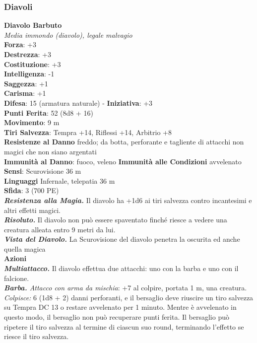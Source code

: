 \begin{multicols}{2}
\subsubsection{Diavoli}

\medskip\textbf{Diavolo Barbuto}\\
\emph{Media immondo (diavolo), legale malvagio}\\
\textbf{Forza}: +3\\
\textbf{Destrezza}: +3\\
\textbf{Costituzione}: +3\\
\textbf{Intelligenza}: -1\\
\textbf{Saggezza}: +1\\
\textbf{Carisma}: +1\\
\textbf{Difesa}: 15 (armatura naturale) - \textbf{Iniziativa}: +3\\
\textbf{Punti Ferita}: 52 (8d8 + 16)\\
\textbf{Movimento}: 9 m\\
\textbf{Tiri Salvezza}: Tempra +14, Riflessi +14, Arbitrio +8\\
\textbf{Resistenze al Danno} freddo; da botta, perforante e tagliente di attacchi non magici che non siano argentati\\
\textbf{Immunità al Danno}: fuoco, veleno \textbf{Immunità alle Condizioni} avvelenato\\
\textbf{Sensi}: Scurovisione 36 m\\
\textbf{Linguaggi} Infernale, telepatia 36 m \\
\textbf{Sfida}: 3 (700 PE)\smallskip\\
\emph{\textbf{Resistenza alla Magia.}} Il diavolo ha +1d6 ai tiri salvezza contro incantesimi e altri effetti magici.\\
\emph{\textbf{Risoluto.}} Il diavolo non può essere spaventato finché riesce a vedere una creatura alleata entro 9 metri da lui.\\
\emph{\textbf{Vista del Diavolo.}} La Scurovisione del diavolo penetra la oscurita ed anche quella magica\\
\smallskip\textbf{Azioni}\\
\emph{\textbf{Multiattacco.}} Il diavolo effettua due attacchi: uno con la barba e uno con il falcione.\\
\emph{\textbf{Barba.} Attacco con arma da mischia}: +7 al colpire, portata 1 m, una creatura.\\
\emph{Colpisce:} 6 (1d8 + 2) danni perforanti, e il bersaglio deve riuscire un tiro salvezza su Tempra DC  13 o restare avvelenato per 1 minuto. Mentre è avvelenato in questo modo, il bersaglio non può recuperare punti ferita. Il bersaglio può ripetere il tiro salvezza al termine di ciascun suo round, terminando l'effetto se riesce il tiro salvezza.\\

\end{multicols}
